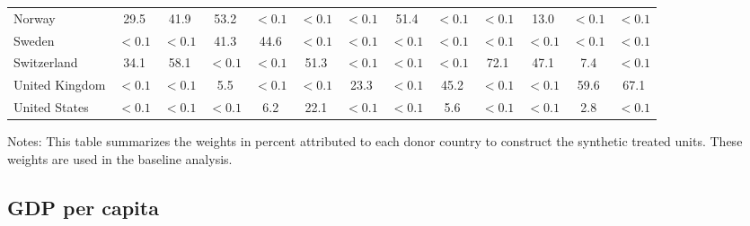 \documentclass[12pt]{article}
\newcommand{\annote}[1]{\parbox{\textwidth}{\renewcommand{\baselinestretch}{1.0}\vspace{12pt} \small Notes: #1}}
\begin{document}
\begin{appendices}
\begin{landscape}
\begin{table}[htbp]
\begin{tabular}{lcccccccccccc}
Norway &       29.5 &       41.9 &      53.2 &       $<0.1$ &       $<0.1$ &       $<0.1$ &     51.4 &       $<0.1$ &       $<0.1$ &      13.0 &       $<0.1$ &       $<0.1$ \\  
Sweden &        $<0.1$ &       $<0.1$ &      41.3 &     44.6 &     $<0.1$ &       $<0.1$ &       $<0.1$ &      $<0.1$ &       $<0.1$ &       $<0.1$ &       $<0.1$ &       $<0.1$ \\  
Switzerland &       34.1 &      58.1 &     $<0.1$ &       $<0.1$ &     51.3 &       $<0.1$ &       $<0.1$ &      $<0.1$ &      72.1 &      47.1 &      7.4 &      $<0.1$ \\  
United Kingdom &      $<0.1$ &       $<0.1$ &       5.5 &       $<0.1$ &       $<0.1$ &      23.3 &       $<0.1$ &       45.2 &       $<0.1$ &       $<0.1$ &      59.6 &       67.1 \\  
United States &        $<0.1$ &       $<0.1$ &     $<0.1$ &     6.2 &      22.1 &      $<0.1$ &       $<0.1$ &     5.6 &       $<0.1$ &       $<0.1$ &       2.8 &     $<0.1$ \\
\bottomrule
\end{tabular}
\annote{This table summarizes the weights in percent attributed to each donor country to construct the synthetic treated units. These weights are used in the baseline analysis.}
\end{table}
\end{landscape}
\clearpage

\subsection{GDP per capita}


\end{appendices}
\end{document}
